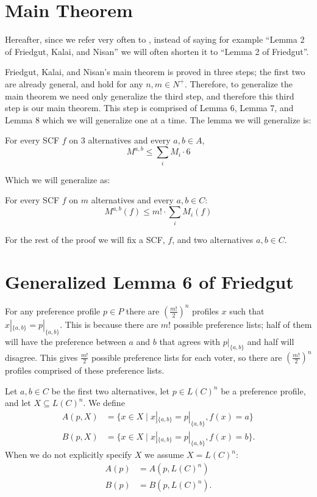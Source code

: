 \section{Main Theorem}

	Hereafter, since we refer very often to \cite{friedgut2008elections}, instead of saying for example ``Lemma 2 of Friedgut, Kalai, and Nisan'' we will often shorten it to ``Lemma 2 of Friedgut''.

	Friedgut, Kalai, and Nisan's main theorem is proved in three steps; the first two are already general, and hold for any $n, m \in N^+$. Therefore, to generalize the main theorem we need only generalize the third step, and therefore this third step is our main theorem. This step is comprised of Lemma 6, Lemma 7, and Lemma 8 which we will generalize one at a time. The lemma we will generalize is:

	\begin{lemma}
		For every SCF $f$ on $3$ alternatives and every $a,b \in A$,
		\[
			M^{a,b} \le \sum_i M_i \cdot 6
		\]
	\end{lemma}

	Which we will generalize as:

	\begin{theorem}
		For every SCF $f$ on $m$ alternatives and every $a, b \in C$:
		\[
			M^{a, b}(f) \le m! \cdot \sum_i M_i(f)
		\]
	\end{theorem}

	For the rest of the proof we will fix a SCF, $f$, and two alternatives $a, b \in C$.


\section{Generalized Lemma 6 of Friedgut}

	For any preference profile $p \in P$ there are $(\frac{m!}{2})^n$ profiles $x$ such that $x|_{\{a, b\}} = p|_{\{a, b\}}$. This is because there are $m!$ possible preference lists; half of them will have the preference between $a$ and $b$ that agrees with $p|_{\{a, b\}}$ and half will disagree. This gives $\frac{m!}{2}$ possible preference lists for each voter, so there are $(\frac{m!}{2})^n$ profiles comprised of these preference lists.

	\begin{definition}
		Let $a, b \in C$ be the first two alternatives, let $p \in L(C)^n$ be a preference profile, and let $X \subseteq L(C)^n$. We define
		\begin{align*}
			A(p, X) &= \{x \in X \mid x|_{\{a,b\}} = p|_{\{a,b\}}, f(x) = a\} \\
			B(p, X) &= \{x \in X \mid x|_{\{a,b\}} = p|_{\{a,b\}}, f(x) = b\}.
		\end{align*}
		When we do not explicitly specify $X$ we assume $X = L(C)^n$:
		\begin{align*}
			A(p) &= A(p, L(C)^n) \\
			B(p) &= B(p, L(C)^n).
		\end{align*}
	\end{definition}

